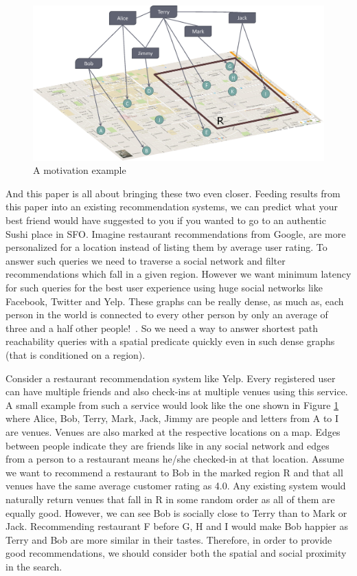\begin{figure}[t]
	\centering
	\includegraphics[width=0.88\linewidth]{images/a_motivation_example.eps}
	\caption{A motivation example}
	\label{fig:begin-example}
\end{figure}

And this paper is all about bringing these two even closer. Feeding results from this paper into an existing recommendation systems, we can predict what your best friend would have suggested to you if you wanted to go to an authentic Sushi place in SFO. Imagine restaurant recommendations from Google, are more personalized for a location instead of listing them by average user rating. To answer such queries we need to traverse a social network and filter recommendations which fall in a given region. However we want minimum latency for such queries for the best user experience using huge social networks like Facebook, Twitter and Yelp. These graphs can be really dense, as much as, each person in the world is connected to every other person by only an average of three and a half other people!~\cite{Taa}. So we need a way to answer shortest path reachability queries with a spatial predicate quickly even in such dense graphs (that is conditioned on a region).

Consider a restaurant recommendation system like Yelp. Every registered user can have multiple friends and also check-ins at multiple venues using this service. A small example from such a service would look like the one shown in Figure \ref{fig:begin-example} where Alice, Bob, Terry, Mark, Jack, Jimmy are people and letters from A to I are venues. Venues are also marked at the respective locations on a map. Edges between people indicate they are friends like in any social network and edges from a person to a restaurant means he/she checked-in at that location. Assume we want to recommend a restaurant to Bob in the marked region R and that all venues have the same average customer rating as 4.0. Any existing system would naturally return venues that fall in R in some random order as all of them are equally good. However, we can see Bob is socially close to Terry than to Mark or Jack. Recommending restaurant F before G, H and I would make Bob happier as Terry and Bob are more similar in their tastes. Therefore, in order to provide good recommendations, we should consider both the spatial and social proximity in the search.

